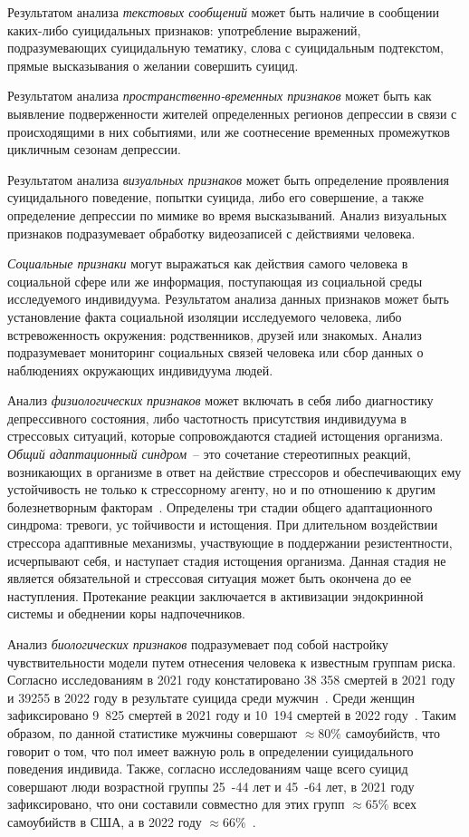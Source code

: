 Результатом анализа  \textit{текстовых сообщений} может быть наличие в сообщении каких-либо суицидальных признаков: употребление выражений, подразумевающих суицидальную тематику, слова с суицидальным подтекстом, прямые высказывания о желании совершить суицид.

Результатом анализа \textit{пространственно-временных признаков} может быть как выявление подверженности жителей определенных регионов депрессии в связи с происходящими в них событиями, или же соотнесение временных промежутков цикличным сезонам депрессии.

Результатом анализа \textit{визуальных признаков} может быть определение проявления суицидального поведение, попытки суицида, либо его совершение, а также определение депрессии по мимике во время высказываний. Анализ визуальных признаков подразумевает обработку видеозаписей с действиями человека.

\textit{Социальные признаки} могут выражаться как действия самого человека в социальной сфере или же информация, поступающая из социальной среды исследуемого индивидуума. Результатом анализа данных признаков может быть установление факта социальной изоляции исследуемого человека, либо встревоженность окружения: родственников, друзей или знакомых. Анализ подразумевает мониторинг социальных связей человека или сбор данных о наблюдениях окружающих индивидуума людей.

Анализ \textit{физиологических признаков} может включать в себя либо диагностику депрессивного состояния, либо частотность присутствия индивидуума в стрессовых ситуаций, которые сопровождаются стадией истощения организма. \textit{Общий адаптационный синдром}~-- это сочетание стереотипных реакций, возникающих в организме в ответ на действие стрессоров и обеспечивающих ему устойчивость не только к стрессорному агенту, но и по отношению к другим болезнетворным факторам~\cite{stressAndPatology}. Определены три стадии общего адаптационного синдрома: тревоги, ус\- тойчивости и истощения. При длительном воздействии стрессора адаптивные механизмы, участвующие в поддержании резистентности, исчерпывают себя, и наступает стадия истощения организма. Данная стадия не является обязательной и стрессовая ситуация может быть окончена до ее наступления. Протекание реакции заключается в активизации эндокринной системы и обеднении коры надпочечников.~\cite{stressAndPatology}

Анализ \textit{биологических признаков} подразумевает под собой настройку чувствительности модели путем отнесения человека к известным группам риска. Согласно исследованиям в 2021 году констатировано 38 358 смертей в 2021 году и 39255 в 2022 году в результате суицида среди мужчин~\cite{suicideStats}. Среди женщин зафиксировано 9~825 смертей в 2021 году и 10~194 смертей в 2022 году~\cite{suicideStats}. Таким образом, по данной статистике мужчины совершают $\approx 80\%$ самоубийств, что говорит о том, что пол имеет важную роль в определении суицидального поведения индивида. Также, согласно исследованиям чаще всего суицид совершают люди возрастной группы 25~-44 лет и 45~-64 лет, в 2021 году зафиксировано, что они составили совместно для этих групп $\approx 65 \%$ всех самоубийств в США, а в 2022 году $\approx 66\%$~\cite{suicideStats}.

